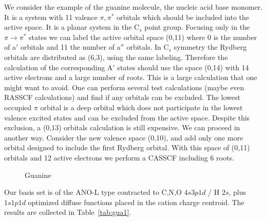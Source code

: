 
We consider 
the example of the guanine molecule, the nucleic acid base monomer.
It is a system with 11 valence $\pi,\pi^*$ orbitals which should be included 
into the active space. It is a planar system 
in the C$_s$ point group. Focusing only in the $\pi\to\pi^*$ states
we can label the active orbital space (0,11) where 0 is the number of
a$'$ orbitals and 11 the number of a$''$ orbitals. In C$_s$ symmetry the 
Rydberg orbitals are distributed as (6,3), using the same labeling.
Therefore the calculation of the corresponding A$'$ states should
use the space (0,14) with 14 active electrons and a large number of
roots. This is a large calculation that one might want to avoid. 
One can perform several
test calculations (maybe even RASSCF calculations) and find if
any orbitals can be excluded. The lowest occupied
$\pi$ orbital is a deep orbital which does not participate in the
lowest valence excited states and can be excluded from the active
space. Despite this exclusion, a (0,13) orbitals calculation is 
still expensive. We can proceed in another way.
Consider the new valence space (0,10), and add only one more
orbital designed to include the first Rydberg orbital.
With this space of (0,11) orbitals and 12 active electrons we perform
a CASSCF including 6 roots. 

\begin{figure}[hp]
\caption{\label{fig:guanine}Guanine}
\end{figure}

Our basis set is of the ANO-L type
contracted to C,N,O $4s3p1d$ / H $2s$, plus $1s1p1d$ optimized
diffuse functions placed in the cation charge centroid.
The results are collected in Table~\ref{tab:gua1}.

